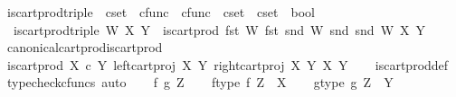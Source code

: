 \begin{isabellebody}
\isanewline
{}\isamarkupfalse%
\ is{\isacharunderscore}{\kern0pt}cart{\isacharunderscore}{\kern0pt}prod{\isacharunderscore}{\kern0pt}triple\ {\isacharcolon}{\kern0pt}{\isacharcolon}{\kern0pt}\ {\isachardoublequoteopen}cset\ {\isasymtimes}\ cfunc\ {\isasymtimes}\ cfunc\ {\isasymRightarrow}\ cset\ {\isasymRightarrow}\ cset\ {\isasymRightarrow}\ bool{\isachardoublequoteclose}\ \isanewline
\ \ {\isachardoublequoteopen}is{\isacharunderscore}{\kern0pt}cart{\isacharunderscore}{\kern0pt}prod{\isacharunderscore}{\kern0pt}triple\ W{\isasympi}\ X\ Y\ {\isasymequiv}\ is{\isacharunderscore}{\kern0pt}cart{\isacharunderscore}{\kern0pt}prod\ {\isacharparenleft}{\kern0pt}fst\ W{\isasympi}{\isacharparenright}{\kern0pt}\ {\isacharparenleft}{\kern0pt}fst\ {\isacharparenleft}{\kern0pt}snd\ W{\isasympi}{\isacharparenright}{\kern0pt}{\isacharparenright}{\kern0pt}\ {\isacharparenleft}{\kern0pt}snd\ {\isacharparenleft}{\kern0pt}snd\ W{\isasympi}{\isacharparenright}{\kern0pt}{\isacharparenright}{\kern0pt}\ X\ Y{\isachardoublequoteclose}\isanewline
\isanewline
{}\isamarkupfalse%
\ canonical{\isacharunderscore}{\kern0pt}cart{\isacharunderscore}{\kern0pt}prod{\isacharunderscore}{\kern0pt}is{\isacharunderscore}{\kern0pt}cart{\isacharunderscore}{\kern0pt}prod{\isacharcolon}{\kern0pt}\isanewline
\ {\isachardoublequoteopen}is{\isacharunderscore}{\kern0pt}cart{\isacharunderscore}{\kern0pt}prod\ {\isacharparenleft}{\kern0pt}X\ {\isasymtimes}\isactrlsub c\ Y{\isacharparenright}{\kern0pt}\ {\isacharparenleft}{\kern0pt}left{\isacharunderscore}{\kern0pt}cart{\isacharunderscore}{\kern0pt}proj\ X\ Y{\isacharparenright}{\kern0pt}\ {\isacharparenleft}{\kern0pt}right{\isacharunderscore}{\kern0pt}cart{\isacharunderscore}{\kern0pt}proj\ X\ Y{\isacharparenright}{\kern0pt}\ X\ Y{\isachardoublequoteclose}\isanewline
%
\isadelimproof
\ \ %
\endisadelimproof
%
\isatagproof
{}\isamarkupfalse%
\ is{\isacharunderscore}{\kern0pt}cart{\isacharunderscore}{\kern0pt}prod{\isacharunderscore}{\kern0pt}def\isanewline
{}\isamarkupfalse%
\ {\isacharparenleft}{\kern0pt}typecheck{\isacharunderscore}{\kern0pt}cfuncs{\isacharcomma}{\kern0pt}\ auto{\isacharparenright}{\kern0pt}\isanewline
\ \ \isamarkupfalse%
\ f\ g\ Z\isanewline
\ \ \isamarkupfalse%
\ f{\isacharunderscore}{\kern0pt}type{\isacharcolon}{\kern0pt}\ {\isachardoublequoteopen}f{\isacharcolon}{\kern0pt}\ Z\ {\isasymrightarrow}\ X{\isachardoublequoteclose}\isanewline
\ \ \isamarkupfalse%
\ g{\isacharunderscore}{\kern0pt}type{\isacharcolon}{\kern0pt}\ {\isachardoublequoteopen}g{\isacharcolon}{\kern0pt}\ Z\ {\isasymrightarrow}\ Y{\isachardoublequoteclose}\isanewline

\end{isabellebody}
